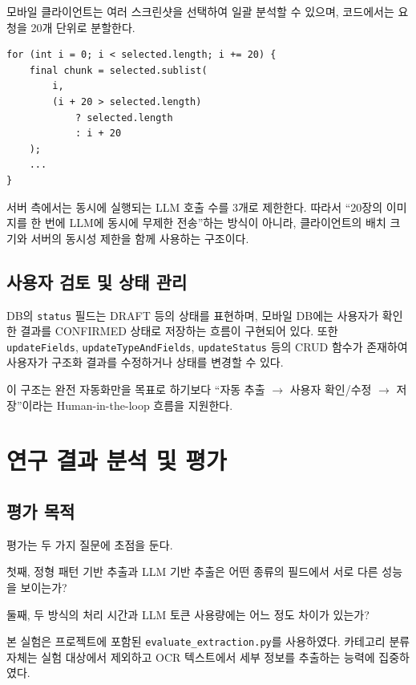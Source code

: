 \documentclass[11pt,a4paper]{article}
\begin{document}
모바일 클라이언트는 여러 스크린샷을 선택하여 일괄 분석할 수 있으며, 코드에서는 요청을 20개 단위로 분할한다.

\begin{lstlisting}
for (int i = 0; i < selected.length; i += 20) {
    final chunk = selected.sublist(
        i,
        (i + 20 > selected.length)
            ? selected.length
            : i + 20
    );
    ...
}
\end{lstlisting}

서버 측에서는 동시에 실행되는 LLM 호출 수를 3개로 제한한다. 따라서 ``20장의 이미지를 한 번에 LLM에 동시에 무제한 전송''하는 방식이 아니라, 클라이언트의 배치 크기와 서버의 동시성 제한을 함께 사용하는 구조이다.

\subsection{사용자 검토 및 상태 관리}

DB의 \texttt{status} 필드는 DRAFT 등의 상태를 표현하며, 모바일 DB에는 사용자가 확인한 결과를 CONFIRMED 상태로 저장하는 흐름이 구현되어 있다. 또한 \texttt{updateFields}, \texttt{updateTypeAndFields}, \texttt{updateStatus} 등의 CRUD 함수가 존재하여 사용자가 구조화 결과를 수정하거나 상태를 변경할 수 있다.

이 구조는 완전 자동화만을 목표로 하기보다 ``자동 추출 $\rightarrow$ 사용자 확인/수정 $\rightarrow$ 저장''이라는 Human-in-the-loop 흐름을 지원한다.

\newpage

\section{연구 결과 분석 및 평가}

\subsection{평가 목적}

평가는 두 가지 질문에 초점을 둔다.

첫째, 정형 패턴 기반 추출과 LLM 기반 추출은 어떤 종류의 필드에서 서로 다른 성능을 보이는가?

둘째, 두 방식의 처리 시간과 LLM 토큰 사용량에는 어느 정도 차이가 있는가?

본 실험은 프로젝트에 포함된 \texttt{evaluate\_extraction.py}를 사용하였다. 카테고리 분류 자체는 실험 대상에서 제외하고 OCR 텍스트에서 세부 정보를 추출하는 능력에 집중하였다.
\end{document}
